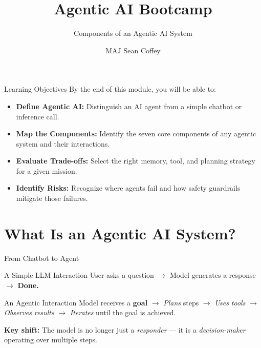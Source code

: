 \documentclass{beamer}       %
\title[]{Agentic AI Bootcamp}
\subtitle[] %
{Components of an Agentic AI System}
\author[] %
{MAJ Sean Coffey} %
\institute
{Army Cyber Institute, U.S. Military Academy}
\date{\monthyeardate}
\begin{document}
{\DivisionLogo
\begin{frame}
    \titlepage
\end{frame}
}

\begin{frame}{Learning Objectives}
    By the end of this module, you will be able to:
    \begin{itemize}
        \item \textbf{Define Agentic AI:} Distinguish an AI agent from a simple chatbot or inference call.
        \item \textbf{Map the Components:} Identify the seven core components of any agentic system and their interactions.
        \item \textbf{Evaluate Trade-offs:} Select the right memory, tool, and planning strategy for a given mission.
        \item \textbf{Identify Risks:} Recognize where agents fail and how safety guardrails mitigate those failures.
    \end{itemize}
\end{frame}

\section{What Is an Agentic AI System?}

\begin{frame}{From Chatbot to Agent}
    \begin{block}{A Simple LLM Interaction}
        User asks a question $\rightarrow$ Model generates a response $\rightarrow$ \textbf{Done.}
    \end{block}
    \vspace{0.3cm}
    \begin{block}{An Agentic Interaction}
        Model receives a \textbf{goal} $\rightarrow$ \textit{Plans} steps $\rightarrow$ \textit{Uses tools} $\rightarrow$ \textit{Observes results} $\rightarrow$ \textit{Iterates} until the goal is achieved.
    \end{block}
    \vspace{0.2cm}
    \textbf{Key shift:} The model is no longer just a \emph{responder} --- it is a \emph{decision-maker} operating over multiple steps.
\end{frame}
\end{document}
